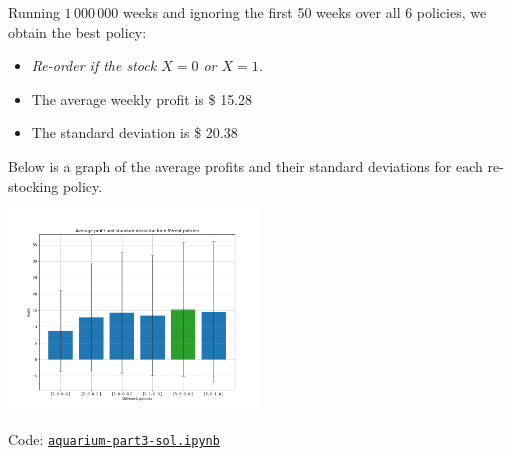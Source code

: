 \begin{solution}
\begin{slide}
\begin{parts}

	\item Running $1\,000\,000$ weeks and ignoring the first 50 weeks over all 6 policies, we obtain the best policy: 
	\begin{itemize}
		\item \textit{Re-order if the stock $X=0$ or $X=1$.}
		\item The average weekly profit is \$ 15.28
		\item The standard deviation is \$ 20.38
	\end{itemize}
	Below is a graph of the average profits and their standard deviations for each re-stocking policy.
	
	\includegraphics[width=0.5\textwidth]{images/aquarium-policies.png}	

	Code: \href{https://utoronto.syzygy.ca/jupyter/user-redirect/git-pull?repo=https://github.com/bigfatbernie/IBLMathModeling&subPath=book/python/aquarium-part3-sol.ipynb}{\tt aquarium-part3-sol.ipynb}
	
	
\end{parts}


	
\end{slide}	
\end{solution}




